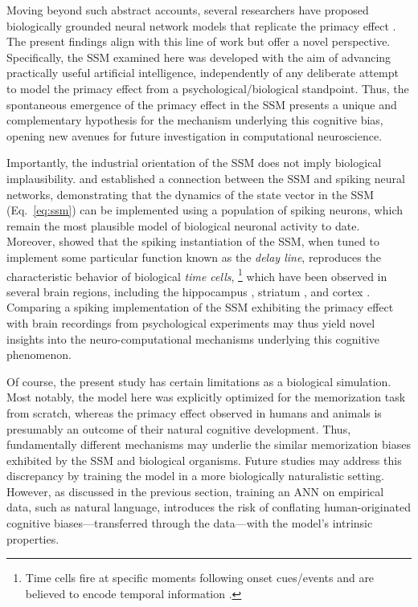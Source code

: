 \documentclass[10pt,letterpaper]{article}
\begin{document}
Moving beyond such abstract accounts, several researchers have proposed biologically grounded neural network models that replicate the primacy effect \citep{Burgess+91,Wong+91,Greene+00,Sikstrom06,Lansner+13}.
The present findings align with this line of work but offer a novel perspective.
Specifically, the SSM examined here was developed with the aim of advancing practically useful artificial intelligence, independently of any deliberate attempt to model the primacy effect from a psychological/biological standpoint.
Thus, the spontaneous emergence of the primacy effect in the SSM presents a unique and complementary hypothesis for the mechanism underlying this cognitive bias, opening new avenues for future investigation in computational neuroscience.


Importantly, the industrial orientation of the SSM does not imply biological implausibility.
\citet{VoelkerEliasmith18} and \citet{Voelker+19} established a connection between the SSM and spiking neural networks, demonstrating that the dynamics of the state vector in the SSM (Eq.~\ref{eq:ssm}) can be implemented using a population of spiking neurons, which remain the most plausible model of biological neuronal activity to date.
Moreover, \citet{VoelkerEliasmith18} showed that the spiking instantiation of the SSM, when tuned to implement some particular function known as the \emph{delay line}, reproduces the characteristic behavior of biological \emph{time cells},%
\footnote{
	Time cells fire at specific moments following onset cues/events and are believed to encode temporal information \citep{MacDonald+11}.
}
which have been observed in several brain regions, including the hippocampus \citep{MacDonald+11,Eichenbaum14}, striatum \citep{Mello+15}, and cortex \citep{Luczak+15}.
Comparing a spiking implementation of the SSM exhibiting the primacy effect with brain recordings from psychological experiments may thus yield novel insights into the neuro-computational mechanisms underlying this cognitive phenomenon.

Of course, the present study has certain limitations as a biological simulation.
Most notably, the model here was explicitly optimized for the memorization task from scratch, whereas the primacy effect observed in humans and animals is presumably an outcome of their natural cognitive development.
Thus, fundamentally different mechanisms may underlie the similar memorization biases exhibited by the SSM and biological organisms.
Future studies may address this discrepancy by training the model in a more biologically naturalistic setting.
However, as discussed in the previous section, training an ANN on empirical data, such as natural language, introduces the risk of conflating human-originated cognitive biases---transferred through the data---with the model's intrinsic properties.
\end{document}
